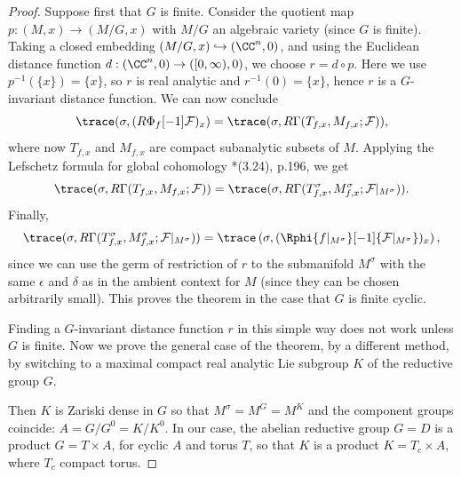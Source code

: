 \documentclass[11pt,letterpaper]{amsart}
\numberwithin{equation}{section}
\begin{document}
\begin{proof}
 Suppose first that $G$ is finite.
Consider the quotient map $p: (M,x)\to (M/G,x)$ with $M/G$ an algebraic variety (since $G$ is finite). Taking a closed embedding $(M/G,x)\hookrightarrow (\CC^n,0)$, and using the Euclidean distance function $d: (\CC^n,0) \to ([0,\infty),0)$, we choose $r = d\circ p$. Here we use $p^{-1}(\{x\}) = \{ x\}$, so $r$ is real analytic and $r^{-1}(0) = \{ x\}$, hence $r$ is a $G$-invariant distance function.
We can now conclude 
\[
\trace(\sigma, (R\Phi_f[-1]\mathcal{F})_x)
=
\trace(\sigma, R\Gamma(T_{f,x}, M_{f,x};\mathcal{F})),
\]
where now $T_{f,x}$ and $M_{f,x}$ are compact subanalytic subsets of $M$.
Applying the Lefschetz formula for global cohomology \cite{Sch03}*{(3.24), p.196}, we get
\[
\trace(\sigma, R\Gamma(T_{f,x}, M_{f,x};\mathcal{F}))
=
\trace(\sigma, R\Gamma(T_{f,x}^\sigma, M_{f,x}^\sigma;\mathcal{F}\vert_{M^\sigma})).
\]
Finally, 
\[
\trace(\sigma, R\Gamma(T_{f,x}^\sigma, M_{f,x}^\sigma;\mathcal{F}\vert_{M^\sigma}))
=
\trace\left(\sigma, (\Rphi{f\vert_{M^\sigma}}[-1]{ \mathcal{F}\vert_{M^\sigma}})_x \right),
\]
since we can use the germ of restriction of $r$ to the submanifold $M^\sigma$ with the same $\epsilon$ and $\delta$ as in the ambient context for $M$ (since they can be chosen arbitrarily small).
This proves the theorem in the case that $G$ is finite cyclic.

Finding a $G$-invariant distance function $r$ in this simple way does not work unless $G$ is finite. 
Now we prove the general case of the theorem, by a different method, by switching to a maximal compact real analytic Lie subgroup $K$ of the reductive group $G$. 

Then $K$ is Zariski dense in $G$ so that $M^\sigma = M^G = M^K$ and the component groups coincide: $A = G/G^0 = K/K^0$.
In our case, the abelian reductive group $G=D$ is a product $G = T\times A$, for cyclic $A$ and torus $T$, so that $K$ is a product $K = T_c\times A$, where $T_c$ compact torus. 


\end{proof}
\end{document}
